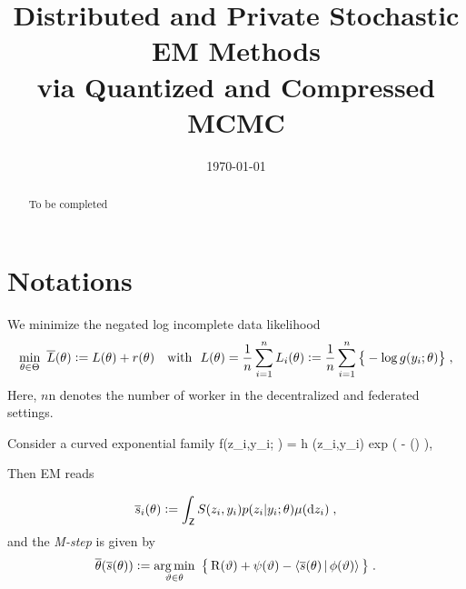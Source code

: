 \documentclass[11pt]{article}
\theoremstyle{t}
\begin{document}
\title{Distributed and Private Stochastic EM Methods\\
via Quantized and Compressed MCMC}
\date{\today}

\maketitle

\begin{abstract}
To be completed
\end{abstract}


\section{Notations}

We minimize the negated log incomplete data likelihood 
\begin{align} \label{eq:em_motivate}
\begin{split} 
 \min_{ \theta \in \Theta }~ \overline{L} ( \theta ) \mathrel{\mathop:}=  L ( \theta ) + r (\theta) \quad \text{with}~~L(\theta) = \frac{1}{n} \sum_{i=1}^n L_i( \theta) \mathrel{\mathop:}=  \frac{1}{n} \sum_{i=1}^n \big\{ - \log g( y_i ; \theta ) \big\}\;,
\end{split} 
\end{align}
Here, $n$n denotes the number of worker in the decentralized and federated settings.

Consider a curved exponential family
\beq \label{eq:exp}
f(z_i,y_i; \theta) = h  (z_i,y_i) \textrm{exp} (  - \psi(\theta) )\eqs,
\eeq

Then EM reads

\begin{align}\label{eq:definition-overline-bss}
\overline{s}_i(\theta) \mathrel{\mathop:}= \int_{\mathsf{Z}} S(z_i,y_i) p(z_i|y_i;\theta) \mu(\mathrm d z_i) \;,
\end{align}
and the \textit{M-step} is given by
\begin{align}\label{eq:mstep}
\overline{\theta}( \overline{s}(\theta) ) \mathrel{\mathop:}= \mathop{\mathrm{arg\,min}}_{ \vartheta \in \theta } ~\big\{ \operatorname{R}( \vartheta ) + \psi( \vartheta) - \left\langle \overline{s}(\theta)\,|\, \phi ( \vartheta)  \right\rangle \big\} \;.
\end{align}
\end{document}
